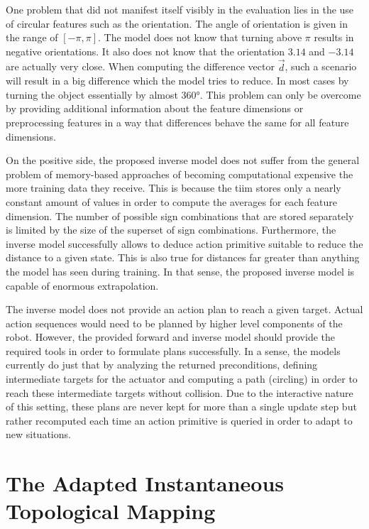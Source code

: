 One problem that did not manifest itself visibly in the evaluation lies in the use of circular features such as the orientation. The angle of orientation is given in the range of $[-\pi,\pi]$. The model does not know that turning above $\pi$ results in negative orientations. It also does not know that the orientation $3.14$ and $-3.14$ are actually very close. When computing the difference vector $\vec{d}$, such a scenario will result in a big difference which the model tries to reduce. In most cases by turning the object essentially by almost 360°. This problem can only be overcome by providing additional information about the feature dimensions or preprocessing features in a way that differences behave the same for all feature dimensions.

On the positive side, the proposed inverse model does not suffer from the general problem of memory-based approaches of becoming computational expensive the more training data they receive. This is because the \gls{tiim} stores only a nearly constant amount of values in order to compute the averages for each feature dimension. The number of possible sign combinations that are stored separately is limited by the size of the superset of sign combinations. Furthermore, the inverse model successfully allows to deduce action primitive suitable to reduce the distance to a given state. This is also true for distances far greater than anything the model has seen during training. In that sense, the proposed inverse model is capable of enormous extrapolation.

The inverse model does not provide an action plan to reach a given target. Actual action sequences would need to be planned by higher level components of the robot. 
However, the provided forward and inverse model should provide the required tools in order to formulate plans successfully.
In a sense, the models currently do just that by analyzing the returned preconditions, defining intermediate targets for the actuator and computing a path (circling) in order to reach these intermediate targets without collision. Due to the interactive nature of this setting, these plans are never kept for more than a single update step but rather recomputed each time an action primitive is queried in order to adapt to new situations.

\section{The Adapted Instantaneous Topological Mapping \label{sec:discAITM}} 

